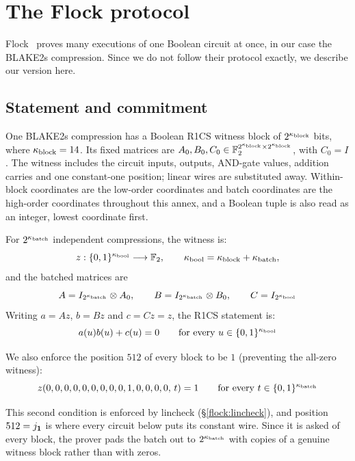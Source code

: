 \section{The Flock protocol}\label{annex:flock}

Flock~\cite{Flock26} proves many executions of one Boolean circuit at once, in our case the BLAKE2s compression. Since we do not follow their protocol exactly, we describe our version here.

\subsection{Statement and commitment}\label{flock:statement}

One BLAKE2s compression has a Boolean R1CS witness block of $2^{\kappa_{\mathrm{block}}}$ bits, where $\kappa_{\mathrm{block}}=14$. Its fixed matrices are $A_0,B_0,C_0\in\mathbb{F}_2^{2^{\kappa_{\mathrm{block}}}\times 2^{\kappa_{\mathrm{block}}}}$, with $C_0=I$. The witness includes the circuit inputs, outputs, AND-gate values, addition carries and one constant-one position; linear wires are substituted away. Within-block coordinates are the low-order coordinates and batch coordinates are the high-order coordinates throughout this annex, and a Boolean tuple is also read as an integer, lowest coordinate first.

For $2^{\kappa_{\mathrm{batch}}}$ independent compressions, the witness is:
\[
z:\{0,1\}^{\kappa_{\mathrm{bool}}}\longrightarrow\mathbb{F}_2,\qquad \kappa_{\mathrm{bool}}=\kappa_{\mathrm{block}}+\kappa_{\mathrm{batch}},
\]
and the batched matrices are
\[
A=I_{2^{\kappa_{\mathrm{batch}}}}\otimes A_0,\qquad B=I_{2^{\kappa_{\mathrm{batch}}}}\otimes B_0,\qquad C=I_{2^{\kappa_{\mathrm{bool}}}}
\]
Writing $a=Az$, $b=Bz$ and $c=Cz=z$, the R1CS statement is:
\begin{equation}\label{flock:eq:r1cs}
a(u)b(u)+c(u)=0\qquad\text{for every }u\in\{0,1\}^{\kappa_{\mathrm{bool}}}
\end{equation}

We also enforce the position $512$ of every block to be $1$ (preventing the all-zero witness):
\begin{equation}\label{flock:eq:const-one}
z(0,0,0,0,0,0,0,0,0,1,0,0,0,0,\,t)=1\qquad\text{for every }t\in\{0,1\}^{\kappa_{\mathrm{batch}}}
\end{equation}

This second condition is enforced by lincheck (\S\ref{flock:lincheck}), and position $512=j_{\mathbf{1}}$ is where every circuit below puts its constant wire. Since it is asked of every block, the prover pads the batch out to $2^{\kappa_{\mathrm{batch}}}$ with copies of a genuine witness block rather than with zeros.

